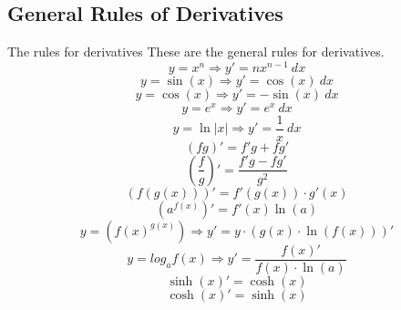 \documentclass[letterpaper,10pt,twoside,twocolumn,openany]{book}
\begin{document}
\subsection{General Rules of Derivatives}
\begin{DndSidebar}{The rules for derivatives}
    These are the general rules for derivatives.
    \begin{equation}
        y = x^n \Rightarrow y' = nx^{n-1}\ dx
    \end{equation}
    \begin{equation}
        y = \sin(x) \Rightarrow y' = \cos(x)\ dx
    \end{equation}
    \begin{equation}
        y = \cos(x) \Rightarrow y' = -\sin(x)\ dx
    \end{equation}
    \begin{equation}
        y = e^x \Rightarrow y' = e^x\ dx
    \end{equation}
    \begin{equation}
        y = \ln|x| \Rightarrow y' = \frac{1}{x}\ dx
    \end{equation}
    \begin{equation}
        (fg)' = f'g + fg'
    \end{equation}
    \begin{equation}
        \left( \frac{f}{g} \right)' = \frac{f'g - fg'}{g^2}
    \end{equation}
    \begin{equation}
        (f(g(x)))' = f'(g(x)) \cdot g'(x)
    \end{equation}
    \begin{equation}
        (a^{f(x)})' = f'(x) \ln(a) 
    \end{equation}
    \begin{equation}
        y = (f(x)^{g(x)}) \Rightarrow y' = y\cdot (g(x)\cdot \ln(f(x)))'
    \end{equation}
    \begin{equation}
        y = log_a f(x) \Rightarrow y' = \frac{f(x)'}{f(x)\cdot\ln(a)}
    \end{equation}
    \begin{equation}
        \sinh(x)' = \cosh(x)
    \end{equation}
    \begin{equation}
        \cosh(x)' = \sinh(x)
    \end{equation}
\end{DndSidebar}
\end{document}
